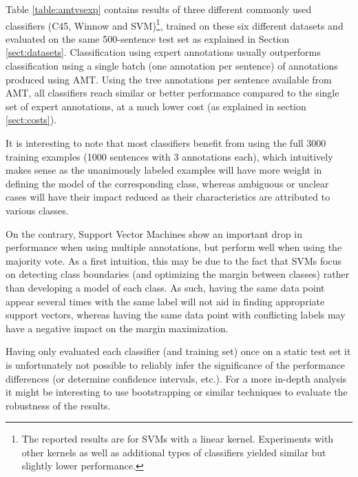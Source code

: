 \documentclass[11pt, a4paper,onecolumn]{article}
\begin{document}
Table \ref{table:amtvsexp} contains results of three different commonly used classifiers (C45, Winnow and SVM)\footnote{The reported results are for SVMs with a linear kernel. Experiments with other kernels as well as additional types of classifiers yielded similar but slightly lower performance.}, trained on these six different datasets and evaluated on the same 500-sentence test set as explained in Section \ref{sect:datasets}.  Classification using expert annotations usually outperforms classification using a single batch (one annotation per sentence) of annotations produced using AMT.  Using the tree annotations per sentence available from AMT, all classifiers reach similar or better performance compared to the single set of expert annotations, at a much lower cost (as explained in section \ref{sect:costs}).

It is interesting to note that most classifiers benefit from using the full 3000 training examples (1000 sentences with 3 annotations each), which intuitively makes sense as the unanimously labeled examples will have more weight in defining the model of the corresponding class, whereas ambiguous or unclear cases will have their impact reduced as their characteristics are attributed to various classes.

On the contrary, Support Vector Machines show an important drop in performance when using multiple annotations, but perform well when using the majority vote.  As a first intuition, this may be due to the fact that SVMs focus on detecting class boundaries (and optimizing the margin between classes) rather than developing a model of each class.  As such, having the same data point appear several times with the same label will not aid in finding appropriate support vectors, whereas having the same data point with conflicting labels may have a negative impact on the margin maximization.

Having only evaluated each classifier (and training set) once on a static test set it is unfortunately not possible to reliably infer the significance of the performance differences (or determine confidence intervals, etc.).  For a more in-depth analysis it might be interesting to use bootstrapping or similar techniques to evaluate the robustness of the results.
\end{document}

